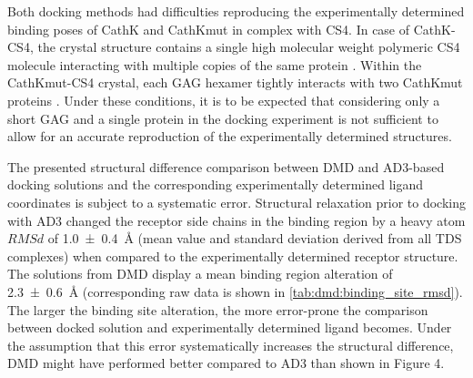 
Both docking methods had difficulties reproducing the experimentally determined
binding poses of CathK and CathKmut in complex with CS4. In case of CathK-CS4,
the crystal structure contains a single high molecular weight polymeric CS4
molecule interacting with multiple copies of the same protein
\cite{catK_cs4_crystal_structure_2008}. Within the CathKmut-CS4 crystal, each
GAG hexamer tightly interacts with two CathKmut proteins
\cite{catKmut_cs4_crystal_2011}. Under these conditions, it is to be expected
that considering only a short GAG and a single protein in the docking experiment
is not sufficient to allow for an accurate reproduction of the experimentally
determined structures.

The presented structural difference comparison between DMD and AD3-based docking
solutions and the corresponding experimentally determined ligand coordinates is
subject to a systematic error. Structural relaxation prior to docking with AD3
changed the receptor side chains in the binding region by a heavy atom $RMSd$ of
\SI{1.0 +- 0.4}{\angstrom} (mean value and standard deviation derived from all
TDS complexes) when compared to the experimentally determined receptor
structure. The solutions from DMD display a mean binding region alteration of
\SI{2.3 +- 0.6}{\angstrom} (corresponding raw data is shown in
\cref{tab:dmd:binding_site_rmsd}). The larger the binding site alteration, the
more error-prone the comparison between docked solution and experimentally
determined ligand becomes. Under the assumption that this error systematically
increases the structural difference, DMD might have performed better compared to
AD3 than shown in Figure 4.


